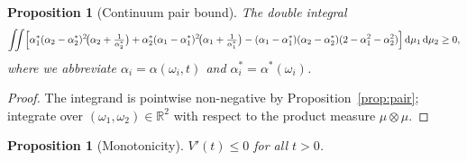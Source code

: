 \documentclass[11pt,a4paper]{article}
\newtheorem{proposition}[theorem]{Proposition}
\theoremstyle{definition}
\newcommand{\R}{\mathbb{R}}
\begin{document}
\begin{proposition}[Continuum pair bound]\label{prop:cpair}
The double integral
\[
\iint \Bigl[\alpha^*_1(\alpha_2-\alpha^*_2)^2\!\bigl(\alpha_2+\tfrac{1}{\alpha^*_2}\bigr) + \alpha^*_2(\alpha_1-\alpha^*_1)^2\!\bigl(\alpha_1+\tfrac{1}{\alpha^*_1}\bigr) - (\alpha_1-\alpha^*_1)(\alpha_2-\alpha^*_2)(2-\alpha_1^2-\alpha_2^2)\Bigr]\,\mathrm{d}\mu_1\,\mathrm{d}\mu_2 \geq 0,
\]
where we abbreviate $\alpha_i = \alpha(\omega_i,t)$ and $\alpha^*_i = \alpha^*(\omega_i)$.
\end{proposition}

\begin{proof}
The integrand is pointwise non-negative by Proposition~\ref{prop:pair}; integrate over $(\omega_1,\omega_2)\in\R^2$ with respect to the product measure $\mu\otimes\mu$.
\end{proof}

\begin{proposition}[Monotonicity]\label{prop:rate}
$V'(t)\leq 0$ for all $t>0$.
\end{proposition}
\end{document}
